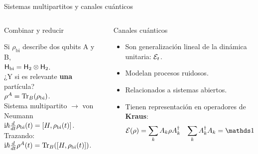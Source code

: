 \begin{frame}{Sistemas multipartitos y canales cuánticos}
    \begin{columns}
        \begin{column}{0.5\textwidth}
            \begin{block}{Combinar y reducir}
                \begin{center}
            Si $\rho_{\text{bi}}$ describe dos qubits A y B,\pause \\
            ${\sf H}_{\text{bi}}={\sf H}_{2}\otimes{\sf H}_{2}$. \pause \\
            \vspace{0.2cm}
           ¿Y si es relevante \textbf{una} partícula?\pause \\
            $\rho^{A}=\Tr_{B}(\rho_{\text{bi}})$. \pause \\
            \vspace{0.2cm} 
            Sistema multipartito $\rightarrow$ von Neumann\\
            $\text{i}\hbar\frac{d}{d t} \rho_{\text{bi}}(t)=[H,\rho_{\text{bi}}(t)]$. \pause \\
            \vspace{0.2cm}
            Trazando:\\
            $\text{i}\hbar\frac{d}{d t} \rho^{A}(t)=\Tr_{B}([H,\rho_{\text{bi}}(t)])$.\pause \\
                \end{center}
            \end{block}
        \end{column}
        \pause
        \begin{column}{0.5\textwidth}
        \begin{block}{Canales cuánticos}
            \begin{itemize}
                \item Son generalización lineal de la dinámica unitaria: $\mathcal{E}_{t}$.
                \item Modelan procesos ruidosos.
                \item Relacionados a sistemas abiertos.
                \item Tienen representación en operadores de \textbf{Kraus}:
                    \begin{align}
                        \mcE(\rho)=\sum_{k}A_{k}\rho A^{\dagger}_{k}& &\sum_{k}A_{k}^{\dagger}A_{k}=\Id \nonumber
                    \end{align}
            \end{itemize}
        \end{block}
        \end{column}
    \end{columns}
\end{frame}



